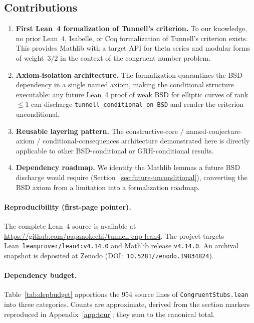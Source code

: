 \documentclass[11pt,a4paper]{article}
\theoremstyle{definition}
\begin{document}
\subsection*{Contributions}
\label{sec:contributions}
\begin{enumerate}
\item \textbf{First Lean~4 formalization of Tunnell's criterion.}
  To our knowledge, no prior Lean~4, Isabelle, or Coq formalization
  of Tunnell's criterion exists.  This provides Mathlib with a
  target API for theta series and modular forms of weight~$3/2$
  in the context of the congruent number problem.
\item \textbf{Axiom-isolation architecture.}  The formalization
  quarantines the BSD dependency in a single named axiom, making
  the conditional structure executable: any future Lean~4 proof of
  weak BSD for elliptic curves of rank~$\leq 1$ can discharge
  \texttt{tunnell\_conditional\_on\_BSD} and render the criterion
  unconditional.
\item \textbf{Reusable layering pattern.}  The
  constructive-core / named-conjecture-axiom / conditional-consequences
  architecture demonstrated here is directly applicable to other
  BSD-conditional or GRH-conditional results.
\item \textbf{Dependency roadmap.}  We identify the Mathlib lemmas
  a future BSD discharge would require
  (Section~\ref{sec:future-unconditional}), converting the BSD
  axiom from a limitation into a formalization roadmap.
\end{enumerate}

\paragraph{Reproducibility (first-page pointer).}
The complete Lean~4 source is available at
\url{https://github.com/papanokechi/tunnell-cnp-lean4}.
The project targets Lean~\texttt{leanprover/lean4:v4.14.0}
and Mathlib release \texttt{v4.14.0}.  An archival snapshot is
deposited at Zenodo
(DOI:~\texttt{10.5281/zenodo.19834824}).

\paragraph{Dependency budget.}
Table~\ref{tab:depbudget} apportions the 954 source lines of
\texttt{CongruentStubs.lean} into three categories.  Counts are
approximate, derived from the section markers reproduced in
Appendix~\ref{app:tour}; they sum to the canonical total.
\end{document}
